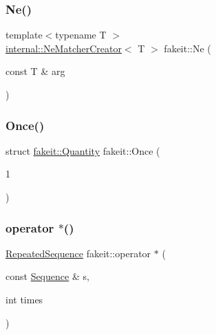 \subsubsection{\texorpdfstring{Ne()}{Ne()}}
{\footnotesize\ttfamily template$<$typename T $>$ \\
\mbox{\hyperlink{structfakeit_1_1internal_1_1NeMatcherCreator}{internal\+::\+Ne\+Matcher\+Creator}}$<$ T $>$ fakeit\+::\+Ne (\begin{DoxyParamCaption}\item[{const T \&}]{arg }\end{DoxyParamCaption})}

\mbox{\label{namespacefakeit_ae29e6d25ba1e6364d241a842b81b849f}} 
\subsubsection{\texorpdfstring{Once()}{Once()}}
{\footnotesize\ttfamily struct \mbox{\hyperlink{structfakeit_1_1Quantity}{fakeit\+::\+Quantity}} fakeit\+::\+Once (\begin{DoxyParamCaption}\item[{1}]{ }\end{DoxyParamCaption})}

\mbox{\label{namespacefakeit_aa07317bf0fd1182d9acd766e1f0eb1a9}} 
\subsubsection{\texorpdfstring{operator $\ast$()}{operator *()}\hspace{0.1cm}{\footnotesize\ttfamily [1/2]}}
{\footnotesize\ttfamily \mbox{\hyperlink{classfakeit_1_1RepeatedSequence}{Repeated\+Sequence}} fakeit\+::operator $\ast$ (\begin{DoxyParamCaption}\item[{const \mbox{\hyperlink{classfakeit_1_1Sequence}{Sequence}} \&}]{s,  }\item[{int}]{times }\end{DoxyParamCaption})\hspace{0.3cm}{\ttfamily [inline]}}

\mbox{\label{namespacefakeit_a0a70868cdce0e8172fbb0706686326b7}} 
